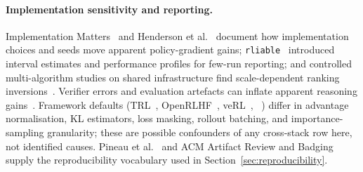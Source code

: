 \paragraph{Implementation sensitivity and reporting.}
Implementation Matters~\cite{engstrom2020implementation} and Henderson et
al.~\cite{henderson2018deep} document how implementation choices and seeds move
apparent policy-gradient gains; \texttt{rliable}~\cite{agarwal2021deep}
introduced interval estimates and performance profiles for few-run reporting;
and controlled multi-algorithm studies on shared infrastructure find
scale-dependent ranking inversions~\cite{li2026oxrl}. Verifier errors and
evaluation artefacts can inflate apparent reasoning gains~\cite{zhang2025verifybench,
hochlehnert2025sober}. Framework defaults (TRL~\cite{vonwerra2022trl},
OpenRLHF~\cite{hu2024openrlhf}, veRL~\cite{sheng2024verl},
\tinker{}~\cite{thinkingmachines2024tinker}) differ in advantage
normalisation, KL estimators, loss masking, rollout batching, and
importance-sampling granularity; these are possible confounders of any
cross-stack row here, not identified causes. Pineau et
al.~\cite{pineau2020improving} and ACM Artifact Review and
Badging~\cite{acm2020badges} supply the reproducibility vocabulary used in
Section~\ref{sec:reproducibility}.
